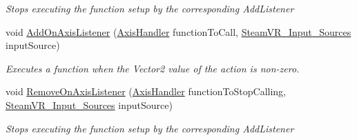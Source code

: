 \begin{DoxyCompactItemize}
\begin{DoxyCompactList}\small\item\em Stops executing the function setup by the corresponding Add\+Listener \end{DoxyCompactList}\item 
void \mbox{\hyperlink{class_valve_1_1_v_r_1_1_steam_v_r___action___vector2_a52cf0999c3cb5f377a61d9b29189cfdd}{Add\+On\+Axis\+Listener}} (\mbox{\hyperlink{class_valve_1_1_v_r_1_1_steam_v_r___action___vector2_a11d8b99df804d185a33c7c60791ef426}{Axis\+Handler}} function\+To\+Call, \mbox{\hyperlink{namespace_valve_1_1_v_r_a82e5bf501cc3aa155444ee3f0662853f}{Steam\+V\+R\+\_\+\+Input\+\_\+\+Sources}} input\+Source)
\begin{DoxyCompactList}\small\item\em Executes a function when the Vector2 value of the action is non-\/zero. \end{DoxyCompactList}\item 
void \mbox{\hyperlink{class_valve_1_1_v_r_1_1_steam_v_r___action___vector2_add5f9659d86eed956636d7495f4af7de}{Remove\+On\+Axis\+Listener}} (\mbox{\hyperlink{class_valve_1_1_v_r_1_1_steam_v_r___action___vector2_a11d8b99df804d185a33c7c60791ef426}{Axis\+Handler}} function\+To\+Stop\+Calling, \mbox{\hyperlink{namespace_valve_1_1_v_r_a82e5bf501cc3aa155444ee3f0662853f}{Steam\+V\+R\+\_\+\+Input\+\_\+\+Sources}} input\+Source)
\begin{DoxyCompactList}\small\item\em Stops executing the function setup by the corresponding Add\+Listener \end{DoxyCompactList}\end{DoxyCompactItemize}
